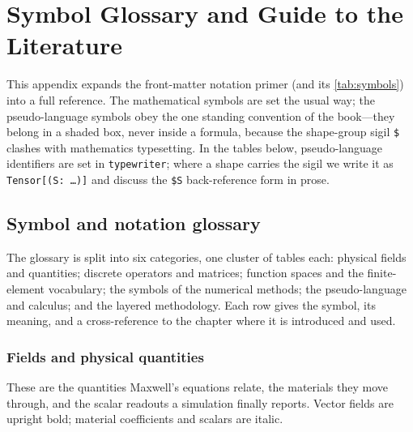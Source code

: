 \chapter{Symbol Glossary and Guide to the Literature}
\label{app:glossary}


This appendix expands the front-matter notation primer (and its
\cref{tab:symbols}) into a full reference. The mathematical symbols are set the
usual way; the pseudo-language symbols obey the one standing convention of the
book---they belong in a shaded box, never inside a formula, because the
shape-group sigil \texttt{\$} clashes with mathematics typesetting. In the
tables below, pseudo-language identifiers are set in \texttt{typewriter}; where a
shape carries the sigil we write it as \texttt{Tensor[(S:\,\dots)]} and discuss
the \texttt{\$S} back-reference form in prose.

\section{Symbol and notation glossary}

The glossary is split into six categories, one cluster of tables each: physical
fields and quantities; discrete operators and matrices; function spaces and the
finite-element vocabulary; the symbols of the numerical methods; the
pseudo-language and calculus; and the layered methodology. Each row gives the
symbol, its meaning, and a cross-reference to the chapter where it is introduced
and used.

\subsection{Fields and physical quantities}

These are the quantities Maxwell's equations relate, the materials they move
through, and the scalar readouts a simulation finally reports. Vector fields are
upright bold; material coefficients and scalars are italic.

